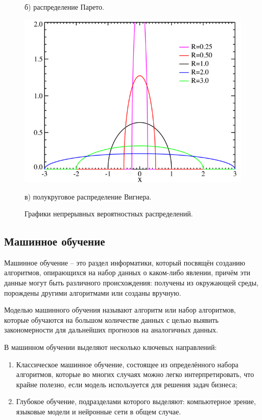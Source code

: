 \documentclass[14pt, russian]{scrartcl}
\begin{document}
\begin{figure}[H]
\begin{minipage}[t]{.45\textwidth}
		\caption*{б) распределение Парето.}
	\end{minipage}
	\begin{minipage}[t]{.45\textwidth}
		\centering
		\includegraphics[width=\linewidth]{./img/vigner.png}
		\caption*{в) полукруговое распределение Вигнера.}
	\end{minipage}
	\caption{Графики непрерывных вероятностных распределений.}
	\label{fig:distr_2}
\end{figure}

\subsection{Машинное обучение}
Машинное обучение -- это раздел информатики, который посвящён созданию алгоритмов, опирающихся на набор данных о каком-либо явлении, причём эти данные могут быть различного происхождения: получены из окружающей среды, порождены другими алгоритмами или созданы вручную\cite{ml1}.

Моделью машинного обучения называют алгоритм или набор алгоритмов, которые обучаются на большом количестве данных с целью выявить закономерности для дальнейших прогнозов на аналогичных данных.

В машинном обучении выделяют несколько ключевых направлений: 

\begin{enumerate}
    \item Классическое машинное обучение, состоящее из определённого набора алгоритмов, которые во многих случаях можно легко интерпретировать, что крайне полезно, если модель используется для решения задач бизнеса;
    \item Глубокое обучение, подразделами которого выделяют: компьютерное зрение, языковые модели и нейронные сети в общем случае.
\end{enumerate}
\end{document}

